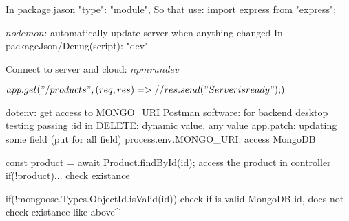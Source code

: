 In package.jason
    "type": "module",
    So that use: import express from "express";

    $nodemon$: automatically update server when anything changed
        In packageJson/Denug(script): "dev"

Connect to server and cloud: $  npm run dev  $

${
app.get("/products",(req,res) => {     %
    // res.send("Server is ready");
})
}$

dotenv:                                         get access to MONGO_URI
Postman software:                               for backend desktop testing
passing :id in DELETE:                          dynamic value, any value  
app.patch:                                      updating some field (put for all field)
process.env.MONGO_URI:                          access MongoDB

const product = await Product.findById(id);     access the product in controller
if(!product)...                                 check existance

if(!mongoose.Types.ObjectId.isValid(id))        check if is valid MongoDB id, does not check existance like above^

